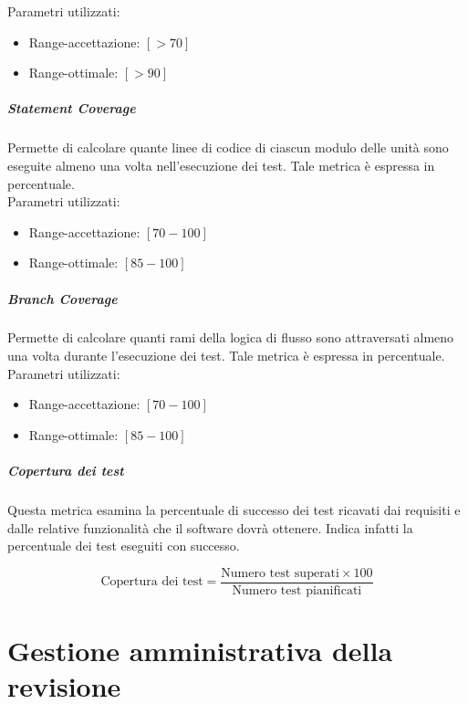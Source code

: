 {  Parametri utilizzati:
  \begin{itemize}
  \item Range-accettazione: $[>70]$
  \item Range-ottimale: $[>90]$\\
  \end{itemize}



  \subparagraph{Statement Coverage}
  Permette di calcolare quante linee di codice di ciascun modulo delle unità sono eseguite almeno
  una volta nell’esecuzione dei test. Tale metrica è espressa in percentuale.\\

  Parametri utilizzati:
  \begin{itemize}
  \item Range-accettazione: $[70 - 100]$
  \item Range-ottimale: $[85 - 100]$
  \end{itemize}

  \subparagraph{Branch Coverage}
  Permette di calcolare quanti rami della logica di flusso sono attraversati almeno una volta durante
  l’esecuzione dei test. Tale metrica è espressa in percentuale.\\

  Parametri utilizzati:
  \begin{itemize}
  \item Range-accettazione: $[70 - 100]$
  \item Range-ottimale: $[85 - 100]$
  \end{itemize}

  \subparagraph{Copertura dei test}
Questa metrica esamina la percentuale di successo dei test ricavati dai requisiti e dalle relative
funzionalità che il software dovrà ottenere. Indica infatti la percentuale dei test eseguiti con
successo.

$$
\text{Copertura dei test} = 
\frac{\text{Numero test superati} \times 100}
{\text{Numero test pianificati}}
$$



  \section{Gestione amministrativa della revisione}

}
